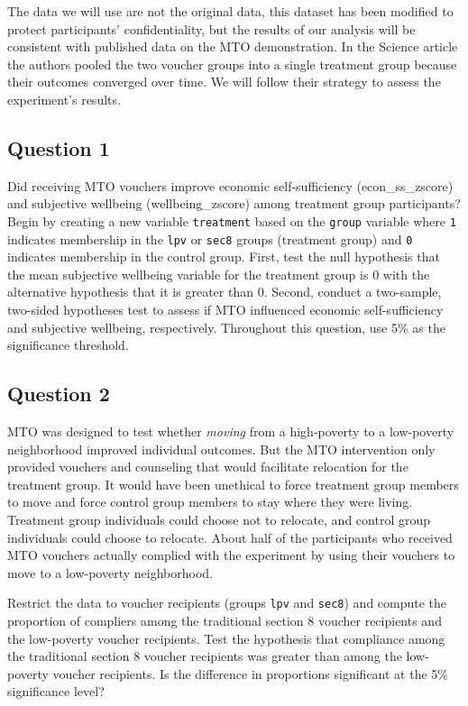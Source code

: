 \documentclass[]{article}
\begin{document}
The data we will use are not the original data, this dataset has been
modified to protect participants' confidentiality, but the results of
our analysis will be consistent with published data on the MTO
demonstration. In the Science article the authors pooled the two voucher
groups into a single treatment group because their outcomes converged
over time. We will follow their strategy to assess the experiment's
results.

\subsection{Question 1}\label{question-1}

Did receiving MTO vouchers improve economic self-sufficiency
(econ\_ss\_zscore) and subjective wellbeing (wellbeing\_zscore) among
treatment group participants? Begin by creating a new variable
\texttt{treatment} based on the \texttt{group} variable where \texttt{1}
indicates membership in the \texttt{lpv} or \texttt{sec8} groups
(treatment group) and \texttt{0} indicates membership in the control
group. First, test the null hypothesis that the mean subjective
wellbeing variable for the treatment group is 0 with the alternative
hypothesis that it is greater than 0. Second, conduct a two-sample,
two-sided hypotheses test to assess if MTO influenced economic
self-sufficiency and subjective wellbeing, respectively. Throughout this
question, use 5\% as the significance threshold.

\subsection{Question 2}\label{question-2}

MTO was designed to test whether \emph{moving} from a high-poverty to a
low-poverty neighborhood improved individual outcomes. But the MTO
intervention only provided vouchers and counseling that would facilitate
relocation for the treatment group. It would have been unethical to
force treatment group members to move and force control group members to
stay where they were living. Treatment group individuals could choose
not to relocate, and control group individuals could choose to relocate.
About half of the participants who received MTO vouchers actually
complied with the experiment by using their vouchers to move to a
low-poverty neighborhood.

Restrict the data to voucher recipients (groups \texttt{lpv} and
\texttt{sec8}) and compute the proportion of compliers among the
traditional section 8 voucher recipients and the low-poverty voucher
recipients. Test the hypothesis that compliance among the traditional
section 8 voucher recipients was greater than among the low-poverty
voucher recipients. Is the difference in proportions significant at the
5\% significance level?
\end{document}
